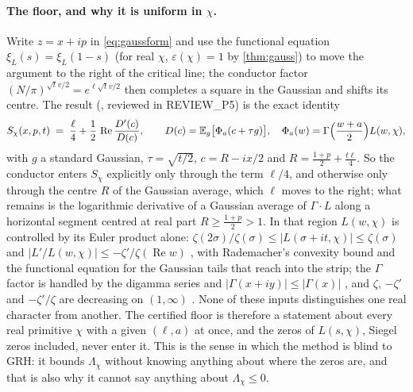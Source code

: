 \documentclass[11pt]{article}
\theoremstyle{definition}
\newcommand{\re}{\operatorname{Re}}
\newcommand{\Lc}{\Lambda}
\begin{document}
\paragraph{The floor, and why it is uniform in $\chi$.} Write $z = x + ip$ in \eqref{eq:gaussform} and use the functional equation $\xi_L(s) = \xi_L(1-s)$ (for real $\chi$, $\varepsilon(\chi) = 1$ by \cref{thm:gauss}) to move the argument to the right of the critical line; the conductor factor $(N/\pi)^{\sqrt t v/2} = e^{\ell\sqrt t v/2}$ then completes a square in the Gaussian and shifts its centre. The result (\cite[P5 memo \S A.3, \S A.6]{dq1records}, reviewed in REVIEW\_P5) is the exact identity
\begin{equation}\label{eq:tilt}
S_\chi(x,p,t) \;=\; \frac{\ell}{4} + \frac12\,\re\frac{D'(c)}{D(c)},\qquad
D(c) = \mathbb{E}_g\bigl[\Phi_a(c + \tau g)\bigr],\quad \Phi_a(w) = \Gamma\Bigl(\frac{w+a}2\Bigr)L(w,\chi),
\end{equation}
with $g$ a standard Gaussian, $\tau = \sqrt{t/2}$, $c = R - ix/2$ and $R = \tfrac{1+p}{2} + \tfrac{t\ell}{4}$. So the conductor enters $S_\chi$ explicitly only through the term $\ell/4$, and otherwise only through the centre $R$ of the Gaussian average, which $\ell$ moves to the right; what remains is the logarithmic derivative of a Gaussian average of $\Gamma\cdot L$ along a horizontal segment centred at real part $R \ge \tfrac{1+p}{2} > 1$. In that region $L(w,\chi)$ is controlled by its Euler product alone: $\zeta(2\sigma)/\zeta(\sigma) \le |L(\sigma+it,\chi)| \le \zeta(\sigma)$ and $|L'/L(w,\chi)| \le -\zeta'/\zeta(\re w)$ \cite[Lemma 2.1 and the proof of Proposition 2.2]{BMOR2020}, with Rademacher's convexity bound \cite[Lemma 5.6, (5.3)]{BMOR2020} and the functional equation for the Gaussian tails that reach into the strip; the $\Gamma$ factor is handled by the digamma series \cite[5.7.6, 5.15.1]{DLMF} and $|\Gamma(x+iy)| \le |\Gamma(x)|$ \cite[5.6.6]{DLMF}, and $\zeta$, $-\zeta'$ and $-\zeta'/\zeta$ are decreasing on $(1,\infty)$ \cite[p.~11]{HakimogluBrown2026}. None of these inputs distinguishes one real character from another. The certified floor is therefore a statement about every real primitive $\chi$ with a given $(\ell, a)$ at once, and the zeros of $L(s,\chi)$, Siegel zeros included, never enter it. This is the sense in which the method is blind to GRH: it bounds $\Lc_\chi$ without knowing anything about where the zeros are, and that is also why it cannot say anything about $\Lc_\chi \le 0$.
\end{document}
